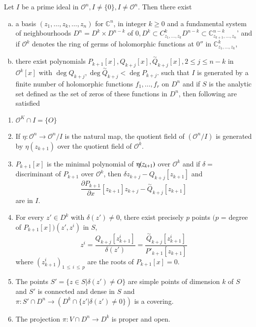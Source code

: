 \begin{theorem}\label{chap1-thm5}  %
  Let $I$ be a prime ideal in $\mathscr{O}^{n}, I \neq \{0\}, I \neq
  \mathscr{O}^{n}$. Then there exist  
  \begin{enumerate}[(a)]
  \item a basis $(z_{1},\ldots,z_{k},\ldots,z_{n})$ for
    $\mathbb{C}^{n}$, in integer $k \ge 0$ and a fundamental system of
    neighbourhoods $D^{n} = D^{k} \times D^{n-k}$ of $0, D^{k} \subset
    C^{k}_{z_{1},\ldots,z_{k}} D^{n-k} \subset
    \mathbb{C}^{n-k}_{z_{k+1},\ldots,z_{n}}$' and if $\mathscr{O}^{k}$
    denotes the ring of germs of holomorphic functions at $0''$ in
    $\mathbb{C}^{k}_{z_{1},\ldots, z_{k}}$, 

  \item there exist polynomials $P_{k+1}[x], Q_{k+j}[x],
    \overset{\sim}{Q}_{k+j}[x], 2 \le j \le n-k $ in $
    \mathscr{O}^{k}[x]$ with $\deg Q_{k+j}, \deg
    \overset{\sim}{Q}_{k+j}< \deg P_{k+j}$. such that $I$ is generated
    by a finite number of holomorphic functions $f_{1}, \ldots ,f_{r}$
    on $D^{n}$ and if $S$ is the analytic set defined as the set of
    zeros of these functions in $D^{n}$, then following are satisfied      
  \end{enumerate}  

  \begin{enumerate}
  \item $\mathscr{O}^{K} \cap I = \{O\}$\pageoriginale

  \item If $\eta:  \mathscr{O}^{n}\to  \mathscr{O}^{n}/I$ is the
    natural map, the quotient field of $(\mathscr{O}^{n}/I)$ is
    generated by $\eta (z_{k+1})$ over the quotient field of $
    \mathscr{O}^{k}$. 

  \item $P_{k+1}[x]$ is the minimal polynomial of $\etaup(z_{k+1})$
    over $ \mathscr{O}^{k}$ and if $\delta = $ discriminant of
    $P_{k+1}$ over $ \mathscr{O}^{k}$, then $\delta z_{k+j}-Q_{k+j}
    [z_{k+1}]$ and 
    $$ 
    \dfrac{\partial P_{k+1}}{\partial x} [z_{k+1}]
    z_{k+j} - \overset{\sim}{Q}_{k+j}[z_{k+1}]
   $$ 
   are in $I$. 

  \item For every $z' \in D^{k}$ with $\delta (z') \neq 0$, there
    exist precisely $p$ points $(p$ = degree of $P_{k+1}[x]) (z',
    z^{i})$ in $S$, 
    $$
    z^{i} = \dfrac{Q_{k+j} [z^{i}_{k+1}]}{\delta(z')} =
    \dfrac{\overset{\sim}{Q}_{k+j}[z^{i}_{k+1}]}{P'_{k+1}[z_{k+1}]}
    $$ 
    where $(z^{i}_{k+1})_{1 \,\le\, i\, \le\, p}$ are the roots of
    $P_{k+1}[x] = 0$. 

  \item The points $S' = \{z \in S | \delta (z') \neq O\}$ are simple
    points of dimension $k$ of $S$ and $S'$ is connected and dense in
    $S$ and $\pi :S' \cap D^{n}\to (D	^{k} \cap \{ z'| \delta (z')
    \neq 0\})$ is a covering.  

  \item The projection $\pi:V \cap D^{n} \to D^{k}$ is proper and open.
  \end{enumerate} 
\end{theorem}
 
